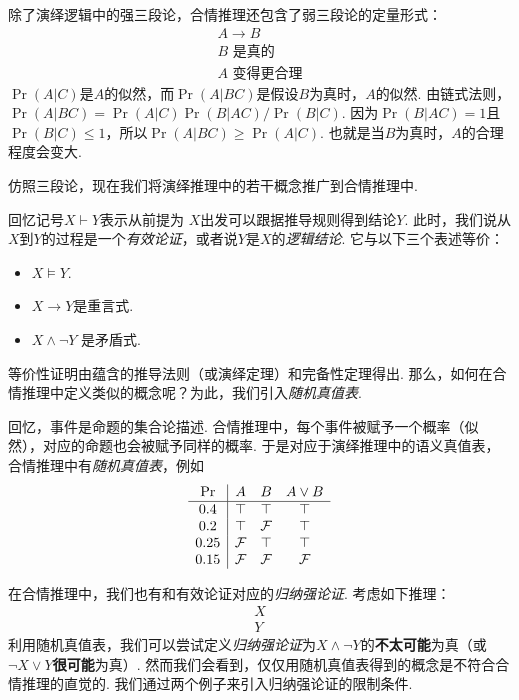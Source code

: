 除了演绎逻辑中的强三段论，合情推理还包含了弱三段论的定量形式：
    \[\begin{array}{c}  
            A \to B \\ B\text{ 是真的} \\ \hline A\text{ 变得更合理}
        \end{array}\]
$\Pr(A|C)$是$A$的似然，而$\Pr(A|BC)$是假设$B$为真时，$A$的似然. 由链式法则，$\Pr(A|BC) = \Pr(A|C)\Pr(B|AC)/\Pr(B|C)$. 因为$\Pr(B|AC) = 1$且$\Pr(B|C)\leq 1$，所以$\Pr(A|BC) \geq \Pr(A|C)$. 也就是当$B$为真时，$A$的合理程度会变大.

仿照三段论，现在我们将演绎推理中的若干概念推广到合情推理中. 

回忆记号$X\vdash Y$表示从前提为 $X$出发可以跟据推导规则得到结论$Y$. 此时，我们说从$X$到$Y$的过程是一个\emph{有效论证}，或者说$Y$是$X$的\emph{逻辑结论}. 它与以下三个表述等价：
    \begin{itemize}
        \item $X\models Y$.
        \item  $X\to Y$是重言式.
        \item $X\wedge \lnot Y$ 是矛盾式.
    \end{itemize}
等价性证明由蕴含的推导法则（或演绎定理）和完备性定理得出. 那么，如何在合情推理中定义类似的概念呢？为此，我们引入\emph{随机真值表}. 

回忆，事件是命题的集合论描述. 合情推理中，每个事件被赋予一个概率（似然），对应的命题也会被赋予同样的概率. 于是对应于演绎推理中的语义真值表，合情推理中有\emph{随机真值表}，例如
\[
\begin{array}{c|ccc}
    \Pr & A & B & A\vee B \\ \hline
    0.4 & \top & \top & \top \\ 
    0.2 & \top & \mathcal{F} & \top \\ 
    0.25 & \mathcal{F} & \top & \top \\
    0.15 & \mathcal{F} & \mathcal{F} & \mathcal{F} \\
\end{array}
\]

在合情推理中，我们也有和有效论证对应的\emph{归纳强论证}. 考虑如下推理：
	\[\begin{array}{c}
	     X\\\hline
	     Y
	\end{array}\]
利用随机真值表，我们可以尝试定义\emph{归纳强论证}为$X\wedge\neg Y$的\textbf{不太可能}为真（或$\neg X\vee Y$\textbf{很可能}为真）. 然而我们会看到，仅仅用随机真值表得到的概念是不符合合情推理的直觉的. 我们通过两个例子来引入归纳强论证的限制条件.



